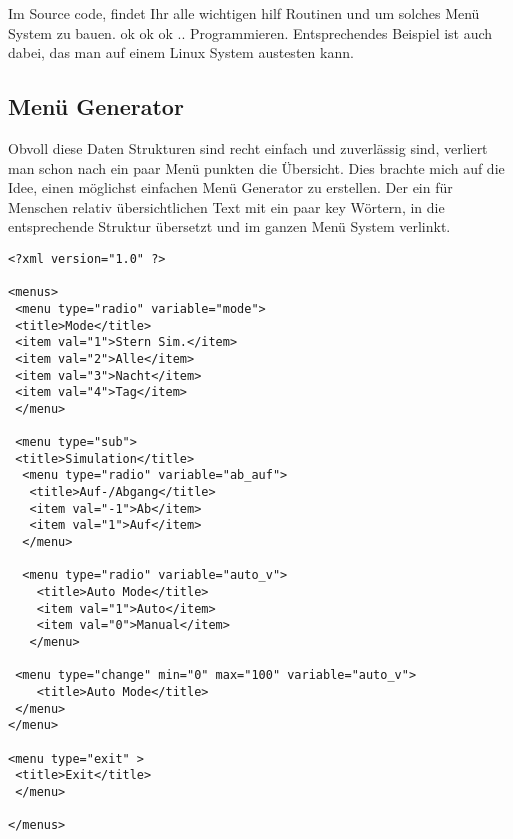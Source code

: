 \documentclass[a4paper]{article}
\begin{document}
Im Source code, findet Ihr alle wichtigen hilf Routinen und um solches Menü System zu bauen. ok ok ok .. Programmieren. Entsprechendes Beispiel ist auch dabei, das man auf einem Linux System austesten kann.\\

\subsection{Men\"u Generator}
Obvoll diese Daten Strukturen sind recht einfach und zuverlässig sind, verliert man schon nach ein paar  Menü punkten die Übersicht.  Dies brachte mich auf die Idee, einen möglichst einfachen Menü Generator zu erstellen. Der ein für Menschen relativ übersichtlichen Text mit ein paar key Wörtern, in die entsprechende Struktur übersetzt und im ganzen Menü System verlinkt. 
\begin{lstlisting}[label=fig:xml,caption={}]
<?xml version="1.0" ?>

<menus>
 <menu type="radio" variable="mode">
 <title>Mode</title>
 <item val="1">Stern Sim.</item>
 <item val="2">Alle</item>
 <item val="3">Nacht</item>
 <item val="4">Tag</item>
 </menu>

 <menu type="sub">
 <title>Simulation</title>
  <menu type="radio" variable="ab_auf">
   <title>Auf-/Abgang</title>
   <item val="-1">Ab</item>
   <item val="1">Auf</item>
  </menu>

  <menu type="radio" variable="auto_v">
    <title>Auto Mode</title>
    <item val="1">Auto</item>
    <item val="0">Manual</item>
   </menu>

 <menu type="change" min="0" max="100" variable="auto_v">
    <title>Auto Mode</title>
 </menu>
</menu>

<menu type="exit" >
 <title>Exit</title>
 </menu>

</menus>
\end{lstlisting}
\end{document}
